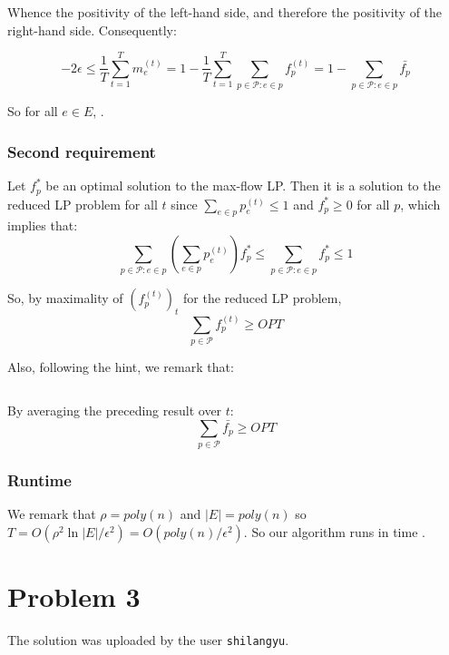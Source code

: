 \documentclass[a4paper, 11pt]{article}
\begin{document}
Whence the positivity of the left-hand side, and therefore the positivity of the right-hand side. Consequently:

$$-2\epsilon \le \frac{1}{T}\sum_{t = 1}^{T}m_e^{(t)} = 1 - \frac{1}{T}\sum_{t=1}^{T}\sum_{p \in \mathcal{P} : e \in p}f_p^{(t)} = 1 - \sum_{p \in \mathcal{P}:e \in p}\bar{f_p}$$

So for all $e \in E$, .

\subsubsection*{Second requirement}

Let $f_p^*$ be an optimal solution to the max-flow LP. Then it is a solution to the reduced LP problem for all $t$ since $\sum_{e \in p} p_e^{(t)} \le 1$ and $f_p^* \ge 0$ for all $p$, which implies that:
$$\sum_{p\in \mathcal{P}:e\in p}\left(\sum_{e \in p} p_e^{(t)}\right)f_p^* \le \sum_{p \in \mathcal{P} : e\in p} f_p^* \le 1$$

So, by maximality of $(f_p^{(t)})_t$ for the reduced LP problem,
$$\sum_{p \in \mathcal{P}}f_p^{(t)} \ge OPT$$

Also, following the hint, we remark that:

$$

$$

By averaging the preceding result over $t$:
$$\boxed{\sum_{p \in \mathcal{P}}\bar{f_p} \ge OPT}$$

\subsubsection*{Runtime}


We remark that $\rho = poly(n)$ and $|E|=poly(n)$ so $T = O(\rho^2\ln{|E|}/\epsilon^2) = O(poly(n)/\epsilon^2)$. So our algorithm runs in time .

\newpage

\section*{Problem 3}

The solution was uploaded by the user \texttt{shilangyu}.
\end{document}
